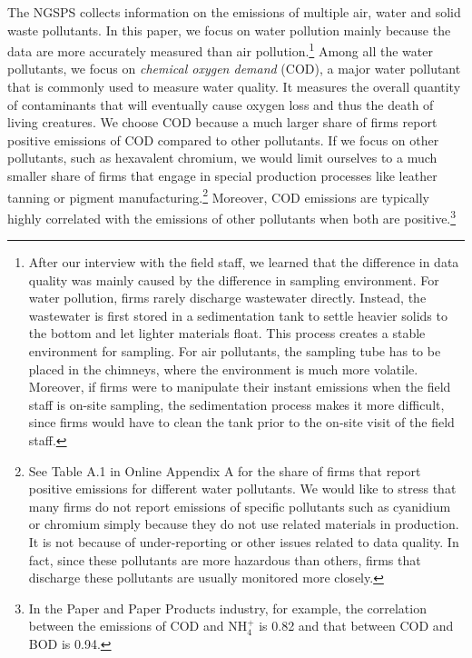 \documentclass[AEJ]{AEA}
\begin{document}
The NGSPS collects information on the emissions of multiple air, water and solid waste pollutants. In this paper, we focus on water pollution mainly because the data are more accurately measured than air pollution.\footnote{After our interview with the field staff, we learned that the difference in data quality was mainly caused by the difference in sampling environment. For water pollution, firms rarely discharge wastewater directly. Instead, the wastewater is first stored in a sedimentation tank to settle heavier solids to the bottom and let lighter materials float. This process creates a stable environment for sampling. For air pollutants, the sampling tube has to be placed in the chimneys, where the environment is much more volatile. Moreover, if firms were to manipulate their instant emissions when the field staff is on-site sampling, the sedimentation process makes it more difficult, since firms would have to clean the tank prior to the on-site visit of the field staff.} Among all the water pollutants, we focus on \textit{chemical oxygen demand} (COD), a major water pollutant that is commonly used to measure water quality. It measures the overall quantity of contaminants that will eventually cause oxygen loss and thus the death of living creatures. We choose COD because a much larger share of firms report positive emissions of COD compared to other pollutants. If we focus on other pollutants, such as hexavalent chromium, we would limit ourselves to a much smaller share of firms that engage in special production processes like leather tanning or pigment manufacturing.\footnote{See Table A.1 in Online Appendix A for the share of firms that report positive emissions for different water pollutants. We would like to stress that many firms do not report emissions of specific pollutants such as cyanidium or chromium simply because they do not use related materials in production. It is not because of under-reporting or other issues related to data quality. In fact, since these pollutants are more hazardous than others, firms that discharge these pollutants are usually monitored more closely.} Moreover, COD emissions are typically highly correlated with the emissions of other pollutants when both are positive.\footnote{In the Paper and Paper Products industry, for example, the correlation between the emissions of COD and $\text{NH}_4^+$ is 0.82 and that between COD and BOD is 0.94.}
\end{document}
